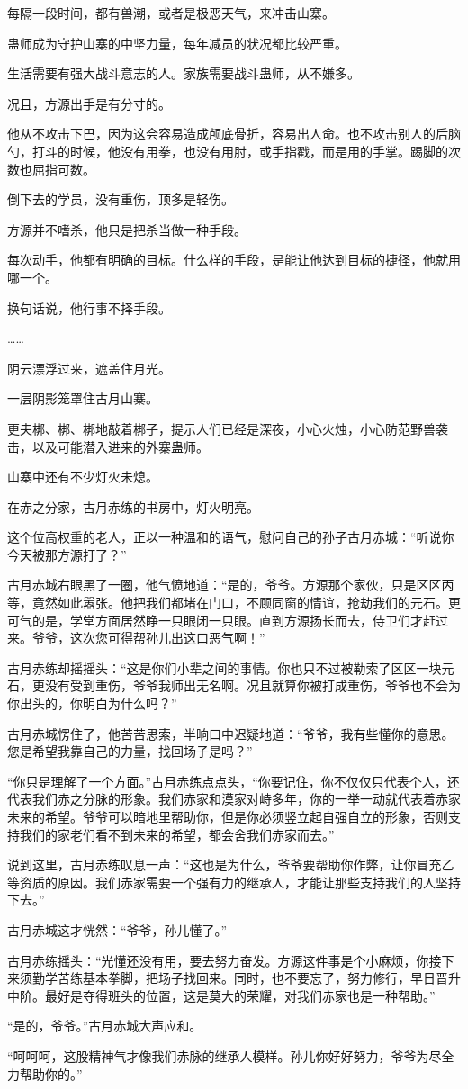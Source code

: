 \begin{this_body}
每隔一段时间，都有兽潮，或者是极恶天气，来冲击山寨。

蛊师成为守护山寨的中坚力量，每年减员的状况都比较严重。

生活需要有强大战斗意志的人。家族需要战斗蛊师，从不嫌多。

况且，方源出手是有分寸的。

他从不攻击下巴，因为这会容易造成颅底骨折，容易出人命。也不攻击别人的后脑勺，打斗的时候，他没有用拳，也没有用肘，或手指戳，而是用的手掌。踢脚的次数也屈指可数。

倒下去的学员，没有重伤，顶多是轻伤。

方源并不嗜杀，他只是把杀当做一种手段。

每次动手，他都有明确的目标。什么样的手段，是能让他达到目标的捷径，他就用哪一个。

换句话说，他行事不择手段。

……

阴云漂浮过来，遮盖住月光。

一层阴影笼罩住古月山寨。

更夫梆、梆、梆地敲着梆子，提示人们已经是深夜，小心火烛，小心防范野兽袭击，以及可能潜入进来的外寨蛊师。

山寨中还有不少灯火未熄。

在赤之分家，古月赤练的书房中，灯火明亮。

这个位高权重的老人，正以一种温和的语气，慰问自己的孙子古月赤城：“听说你今天被那方源打了？”

古月赤城右眼黑了一圈，他气愤地道：“是的，爷爷。方源那个家伙，只是区区丙等，竟然如此嚣张。他把我们都堵在门口，不顾同窗的情谊，抢劫我们的元石。更可气的是，学堂方面居然睁一只眼闭一只眼。直到方源扬长而去，侍卫们才赶过来。爷爷，这次您可得帮孙儿出这口恶气啊！”

古月赤练却摇摇头：“这是你们小辈之间的事情。你也只不过被勒索了区区一块元石，更没有受到重伤，爷爷我师出无名啊。况且就算你被打成重伤，爷爷也不会为你出头的，你明白为什么吗？”

古月赤城愣住了，他苦苦思索，半晌口中迟疑地道：“爷爷，我有些懂你的意思。您是希望我靠自己的力量，找回场子是吗？”

“你只是理解了一个方面。”古月赤练点点头，“你要记住，你不仅仅只代表个人，还代表我们赤之分脉的形象。我们赤家和漠家对峙多年，你的一举一动就代表着赤家未来的希望。爷爷可以暗地里帮助你，但是你必须竖立起自强自立的形象，否则支持我们的家老们看不到未来的希望，都会舍我们赤家而去。”

说到这里，古月赤练叹息一声：“这也是为什么，爷爷要帮助你作弊，让你冒充乙等资质的原因。我们赤家需要一个强有力的继承人，才能让那些支持我们的人坚持下去。”

古月赤城这才恍然：“爷爷，孙儿懂了。”

古月赤练摇头：“光懂还没有用，要去努力奋发。方源这件事是个小麻烦，你接下来须勤学苦练基本拳脚，把场子找回来。同时，也不要忘了，努力修行，早日晋升中阶。最好是夺得班头的位置，这是莫大的荣耀，对我们赤家也是一种帮助。”

“是的，爷爷。”古月赤城大声应和。

“呵呵呵，这股精神气才像我们赤脉的继承人模样。孙儿你好好努力，爷爷为尽全力帮助你的。”

\end{this_body}

